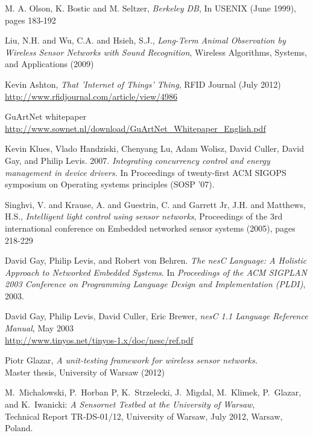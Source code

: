 \begin{thebibliography}{99}

  M. A. Olson, K. Bostic and M. Seltzer,
  \textit{Berkeley DB},
  In USENIX (June 1999), pages 183-192

  Liu, N.H. and Wu, C.A. and Hsieh, S.J.,
  \textit{Long-Term Animal Observation by Wireless Sensor Networks with Sound Recognition},
  Wireless Algorithms, Systems, and Applications (2009)

  Kevin Ashton,
  \textit{That 'Internet of Things' Thing},
  RFID Journal (July 2012) \url{http://www.rfidjournal.com/article/view/4986}

  GuArtNet whitepaper \url{http://www.sownet.nl/download/GuArtNet\_Whitepaper\_English.pdf}

  Kevin Klues, Vlado Handziski, Chenyang Lu, Adam Wolisz, David Culler, David Gay, and Philip Levis. 2007.
  \textit{Integrating concurrency control and energy management in device drivers.}
  In Proceedings of twenty-first ACM SIGOPS symposium on Operating systems principles (SOSP '07). 

  Singhvi, V. and Krause, A. and Guestrin, C. and Garrett Jr, J.H. and Matthews, H.S.,
  \textit{Intelligent light control using sensor networks},
  Proceedings of the 3rd international conference on Embedded networked sensor systems (2005), pages 218-229

  David Gay, Philip Levis, and Robert von Behren.
  \textit{The nesC Language: A Holistic Approach
  to Networked Embedded Systems}.  \newblock In
  {\em Proceedings of the ACM SIGPLAN 2003
  Conference on Programming Language Design and
  Implementation (PLDI)}, 2003.

  David Gay, Philip Levis, David Culler, Eric Brewer,
  \textit{nesC 1.1 Language Reference Manual},
  May 2003 \\
  \url{http://www.tinyos.net/tinyos-1.x/doc/nesc/ref.pdf}


  Piotr Glazar, \textit{A unit-testing framework
  for wireless sensor networks.} \\ Master thesis,
  University of Warsaw (2012)

  M.~Michalowski, P.~Horban P, K.~Strzelecki, J.~Migdal, M.~Klimek, P.~Glazar, and K.~Iwanicki:
  \textit{A Sensornet Testbed at the University of Warsaw}, \\
  Technical Report TR-DS-01/12, University of Warsaw, July 2012, Warsaw, Poland.


\end{thebibliography}
